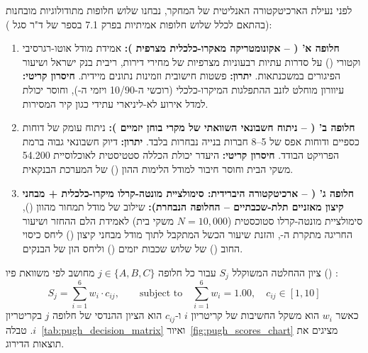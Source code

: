 לפני נעילת הארכיטקטורה האנליטית של המחקר, נבחנו שלוש חלופות מתודולוגיות מובחנות (בהתאם לכלל שלוש חלופות אמיתיות בפרק \num{7.1} בספר של ד"ר סגל \cite{segal2026prep}):
\begin{enumerate}[label=\textbf{\arabic*.},rightmargin=0.6cm]
  \item \textbf{חלופה א' ( – אקונומטריקה מאקרו-כלכלית מצרפית ):} אמידת מודל אוטו-רגרסיבי וקטורי () על סדרות עתיות רבעוניות מצרפיות של מחירי דירות, ריבית בנק ישראל ושיעור הפיגורים במשכנתאות. \textbf{יתרון:} פשטות חישובית וזמינות נתונים מיידית. \textbf{חיסרון קריטי:} עיוורון מוחלט לזנב ההתפלגות המיקרו-כלכלי (רוכשי ה-\num{10/90} ויזמי ה-), וחוסר יכולת למדל אירוע לא-ליניארי עתידי כגון קיר המסירות.
  \item \textbf{חלופה ב' ( – ניתוח חשבונאי השוואתי של מקרי בוחן יזמיים ):} ניתוח עומק של דוחות כספיים ודוחות אפס של \num{5}--\num{8} חברות בנייה נבחרות בלבד. \textbf{יתרון:} דיוק חשבונאי גבוה ברמת הפרויקט הבודד. \textbf{חיסרון קריטי:} היעדר יכולת הכללה סטטיסטית לאוכלוסיית \num{54,200} משקי הבית וחוסר חיבור למודל הלימות ההון () של המערכת הבנקאית.
  \item \textbf{חלופה ג' ( – ארכיטקטורה היברידית: סימולציית מונטה-קרלו מיקרו-כלכלית + מבחני קיצון מאזניים תלת-שכבתיים – החלופה הנבחרת):} שילוב של מודל תמחור מהוון (), סימולציית מונטה-קרלו סטוכסטית ($N=10,000$ משקי בית) לאמידת הלם ההחזר ושיעור החריגה מתקרת ה-, והזנת שיעור הכשל המתקבל לתוך מודל מבחני קיצון () ליחס כיסוי החוב () של שלוש שכבות יזמים () וליחס הון  של הבנקים.
\end{enumerate}

ציון ההחלטה המשוקלל $S_j$ עבור כל חלופה $j \in \{A, B, C\}$ מחושב לפי משוואת פיו () \cite{pugh1991total,segal2026prep}:
\begin{equation}
\label{eq:pugh_score}
S_j = \sum_{i=1}^{6} w_i \cdot c_{ij}, \qquad \text{subject to} \quad \sum_{i=1}^{6} w_i = 1.00, \quad c_{ij} \in [1, 10]
\end{equation}
כאשר $w_i$ הוא משקל החשיבות של קריטריון $i$ ו-$c_{ij}$ הוא הציון ההנדסי של חלופה $j$ בקריטריון $i$. טבלה~\ref{tab:pugh_decision_matrix} ואיור~\ref{fig:pugh_scores_chart} מציגים את תוצאות הדירוג.

